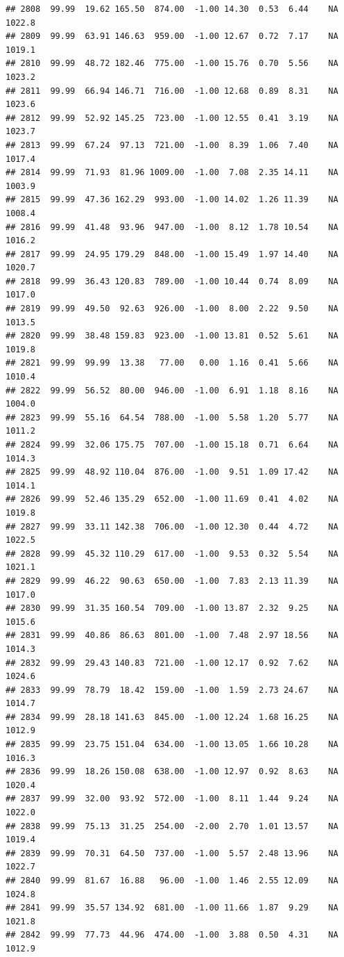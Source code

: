 \documentclass{article}\usepackage{graphicx, color}
\makeatletter
\newenvironment{kframe}{%
 \def\at@end@of@kframe{}%
 \ifinner\ifhmode%
  \def\at@end@of@kframe{\end{minipage}}%
  \begin{minipage}{\columnwidth}%
 \fi\fi%
 \def\FrameCommand##1{\hskip\@totalleftmargin \hskip-\fboxsep
 \colorbox{shadecolor}{##1}\hskip-\fboxsep
     \hskip-\linewidth \hskip-\@totalleftmargin \hskip\columnwidth}%
 \MakeFramed {\advance\hsize-\width
   \@totalleftmargin\z@ \linewidth\hsize
   \@setminipage}}%
 {\par\unskip\endMakeFramed%
 \at@end@of@kframe}
\newenvironment{knitrout}{}{} %
\makeatother
\begin{document}
\begin{knitrout}
\begin{kframe}
\begin{verbatim}
## 2808  99.99  19.62 165.50  874.00  -1.00 14.30  0.53  6.44    NA 1022.8
## 2809  99.99  63.91 146.63  959.00  -1.00 12.67  0.72  7.17    NA 1019.1
## 2810  99.99  48.72 182.46  775.00  -1.00 15.76  0.70  5.56    NA 1023.2
## 2811  99.99  66.94 146.71  716.00  -1.00 12.68  0.89  8.31    NA 1023.6
## 2812  99.99  52.92 145.25  723.00  -1.00 12.55  0.41  3.19    NA 1023.7
## 2813  99.99  67.24  97.13  721.00  -1.00  8.39  1.06  7.40    NA 1017.4
## 2814  99.99  71.93  81.96 1009.00  -1.00  7.08  2.35 14.11    NA 1003.9
## 2815  99.99  47.36 162.29  993.00  -1.00 14.02  1.26 11.39    NA 1008.4
## 2816  99.99  41.48  93.96  947.00  -1.00  8.12  1.78 10.54    NA 1016.2
## 2817  99.99  24.95 179.29  848.00  -1.00 15.49  1.97 14.40    NA 1020.7
## 2818  99.99  36.43 120.83  789.00  -1.00 10.44  0.74  8.09    NA 1017.0
## 2819  99.99  49.50  92.63  926.00  -1.00  8.00  2.22  9.50    NA 1013.5
## 2820  99.99  38.48 159.83  923.00  -1.00 13.81  0.52  5.61    NA 1019.8
## 2821  99.99  99.99  13.38   77.00   0.00  1.16  0.41  5.66    NA 1010.4
## 2822  99.99  56.52  80.00  946.00  -1.00  6.91  1.18  8.16    NA 1004.0
## 2823  99.99  55.16  64.54  788.00  -1.00  5.58  1.20  5.77    NA 1011.2
## 2824  99.99  32.06 175.75  707.00  -1.00 15.18  0.71  6.64    NA 1014.3
## 2825  99.99  48.92 110.04  876.00  -1.00  9.51  1.09 17.42    NA 1014.1
## 2826  99.99  52.46 135.29  652.00  -1.00 11.69  0.41  4.02    NA 1019.8
## 2827  99.99  33.11 142.38  706.00  -1.00 12.30  0.44  4.72    NA 1022.5
## 2828  99.99  45.32 110.29  617.00  -1.00  9.53  0.32  5.54    NA 1021.1
## 2829  99.99  46.22  90.63  650.00  -1.00  7.83  2.13 11.39    NA 1017.0
## 2830  99.99  31.35 160.54  709.00  -1.00 13.87  2.32  9.25    NA 1015.6
## 2831  99.99  40.86  86.63  801.00  -1.00  7.48  2.97 18.56    NA 1014.3
## 2832  99.99  29.43 140.83  721.00  -1.00 12.17  0.92  7.62    NA 1024.6
## 2833  99.99  78.79  18.42  159.00  -1.00  1.59  2.73 24.67    NA 1014.7
## 2834  99.99  28.18 141.63  845.00  -1.00 12.24  1.68 16.25    NA 1012.9
## 2835  99.99  23.75 151.04  634.00  -1.00 13.05  1.66 10.28    NA 1016.3
## 2836  99.99  18.26 150.08  638.00  -1.00 12.97  0.92  8.63    NA 1020.4
## 2837  99.99  32.00  93.92  572.00  -1.00  8.11  1.44  9.24    NA 1022.0
## 2838  99.99  75.13  31.25  254.00  -2.00  2.70  1.01 13.57    NA 1019.4
## 2839  99.99  70.31  64.50  737.00  -1.00  5.57  2.48 13.96    NA 1022.7
## 2840  99.99  81.67  16.88   96.00  -1.00  1.46  2.55 12.09    NA 1024.8
## 2841  99.99  35.57 134.92  681.00  -1.00 11.66  1.87  9.29    NA 1021.8
## 2842  99.99  77.73  44.96  474.00  -1.00  3.88  0.50  4.31    NA 1012.9

\end{verbatim}
\end{kframe}
\end{knitrout}
\end{document}
